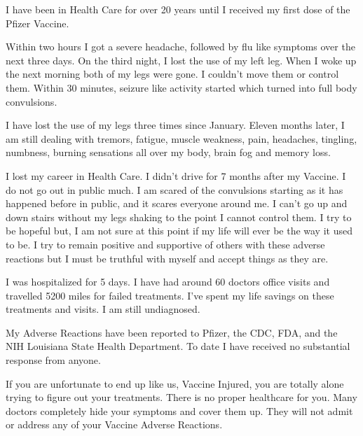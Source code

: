 I have been in Health Care for over 20 years until I received my first dose of
the Pfizer Vaccine.

Within two hours I got a severe headache, followed by flu like symptoms over the
next three days. On the third night, I lost the use of my left leg. When I woke
up the next morning both of my legs were gone. I couldn’t move them or control
them. Within 30 minutes, seizure like activity started which turned into full
body convulsions.

I have lost the use of my legs three times since January. Eleven months later, I
am still dealing with tremors, fatigue, muscle weakness, pain, headaches,
tingling, numbness, burning sensations all over my body, brain fog and memory
loss.

I lost my career in Health Care. I didn’t drive for 7 months after my Vaccine. I
do not go out in public much. I am scared of the convulsions starting as it has
happened before in public, and it scares everyone around me. I can’t go up and
down stairs without my legs shaking to the point I cannot control them. I try to
be hopeful but, I am not sure at this point if my life will ever be the way it
used to be. I try to remain positive and supportive of others with these adverse
reactions but I must be truthful with myself and accept things as they are.

I was hospitalized for 5 days. I have had around 60 doctors office visits and
travelled 5200 miles for failed treatments. I’ve spent my life savings on these
treatments and visits. I am still undiagnosed.

My Adverse Reactions have been reported to Pfizer, the CDC, FDA, and the NIH
Louisiana State Health Department. To date I have received no substantial
response from anyone.

If you are unfortunate to end up like us, Vaccine Injured, you are totally alone
trying to figure out your treatments. There is no proper healthcare for
you. Many doctors completely hide your symptoms and cover them up. They will not
admit or address any of your Vaccine Adverse Reactions.
